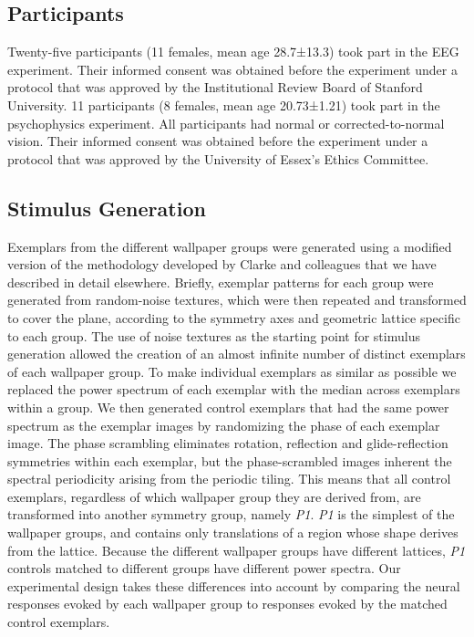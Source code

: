 \documentclass[11pt, twoside]{article}
\begin{document}
\subsection*{Participants}
Twenty-five participants (11 females, mean age 28.7±13.3) took part in the EEG experiment. Their informed consent was obtained before the experiment under a protocol that was approved by the Institutional Review Board of Stanford University. 11 participants (8 females, mean age 20.73±1.21) took part in the psychophysics experiment. All participants had normal or corrected-to-normal vision. Their informed consent was obtained before the experiment under a protocol that was approved by the University of Essex's Ethics Committee.

\subsection*{Stimulus Generation}
Exemplars from the different wallpaper groups were generated using a modified version of the methodology developed by Clarke and colleagues\cite{RN172} that we have described in detail elsewhere\cite{RN1725}. Briefly, exemplar patterns for each group were generated from random-noise textures, which were then repeated and transformed to cover the plane, according to the symmetry axes and geometric lattice specific to each group. The use of noise textures as the starting point for stimulus generation allowed the creation of an almost infinite number of distinct exemplars of each wallpaper group. To make individual exemplars as similar as possible we replaced the power spectrum of each exemplar with the median across exemplars within a group. We then generated control exemplars that had the same power spectrum as the exemplar images by randomizing the phase of each exemplar image. The phase scrambling eliminates rotation, reflection and glide-reflection symmetries within each exemplar, but the phase-scrambled images inherent the spectral periodicity arising from the periodic tiling. This means that all control exemplars, regardless of which wallpaper group they are derived from, are transformed into another symmetry group, namely \textit{P1}. \textit{P1} is the simplest of the wallpaper groups, and contains only translations of a region whose shape derives from the lattice. Because the different wallpaper groups have different lattices, \textit{P1} controls matched to different groups have different power spectra. Our experimental design takes these differences into account by comparing the neural responses evoked by each wallpaper group to responses evoked by the matched control exemplars.
\end{document}
